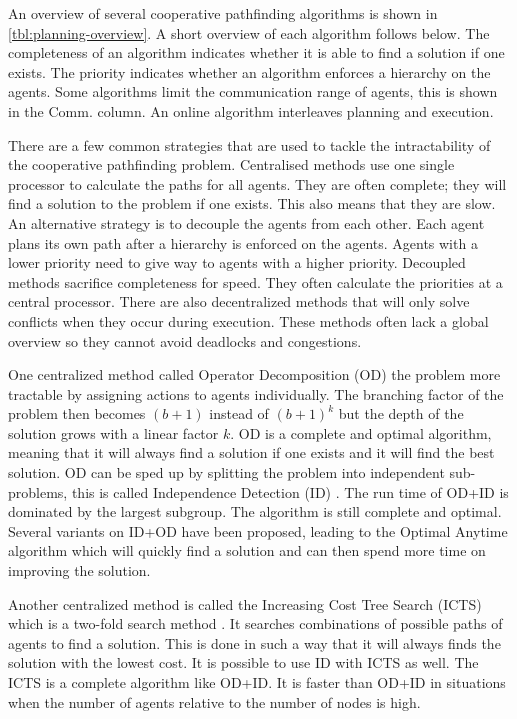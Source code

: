 An overview of several cooperative pathfinding algorithms is shown in 
\autoref{tbl:planning-overview}. A short overview of each algorithm follows 
below. The completeness of an algorithm indicates whether it is able to find a 
solution if one exists. The priority indicates whether an algorithm enforces a 
hierarchy on the agents. Some algorithms limit the communication range of 
agents, this is shown in the Comm. column. An online algorithm interleaves 
planning and execution.

There are a few common strategies that are used to tackle the intractability of 
the cooperative pathfinding problem. Centralised methods use one single 
processor to calculate the paths for all agents. They are often complete; they 
will find a solution to the problem if one exists. This also means that they 
are slow. An alternative strategy is to decouple the agents from each other. 
Each agent plans its own path after a hierarchy is enforced on the agents. 
Agents with a lower priority need to give way to agents with a higher priority. 
Decoupled methods sacrifice completeness for speed. They often calculate the 
priorities at a central processor. There are also decentralized methods that 
will only solve conflicts when they occur during execution. These methods often 
lack a global overview so they cannot avoid deadlocks and congestions.

One centralized method called Operator Decomposition (OD) 
\citep{standley2010,standley2011} the problem more tractable by assigning 
actions to agents individually. The branching factor of the problem then 
becomes $(b+1)$ instead of $(b+1)^k$ but the depth of the solution grows with a 
linear factor $k$. OD is a complete and optimal algorithm, meaning that it 
will always find a solution if one exists and it will find the best solution. 
OD can be sped up by splitting the problem into independent sub-problems, this 
is called Independence Detection (ID) \citep{standley2010}. The run time of 
OD+ID is dominated by the largest subgroup. The algorithm is still complete and 
optimal. Several variants on ID+OD have been proposed, leading to the Optimal 
Anytime algorithm \citep{standley2011} which will quickly find a solution and 
can then spend more time on improving the solution.

Another centralized method is called the Increasing Cost Tree Search (ICTS)
which is a two-fold search method \citep{sharon2013}. It searches combinations 
of possible paths of agents to find a solution. This is done in such a way that 
it will always finds the solution with the lowest cost. It is possible to use 
ID with ICTS as well. The ICTS is a complete algorithm like OD+ID. It is faster 
than OD+ID in situations when the number of agents relative to the number of 
nodes is high.

